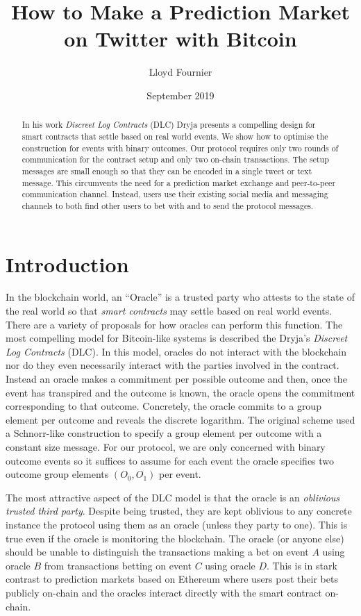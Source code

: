 \documentclass[runningheads]{llncs}
\begin{document}
\title{How to Make a Prediction Market on Twitter with Bitcoin}
\author{Lloyd Fournier}
\date{September 2019}

\maketitle

\begin{abstract}
In his work \emph{Discreet Log Contracts} (DLC) Dryja presents a compelling design for smart contracts that settle based on real world events. We show how to optimise the construction for events with binary outcomes. Our protocol requires only two rounds of communication for the contract setup and only two on-chain transactions. The setup messages are small enough so that they can be encoded in a single tweet or text message. This circumvents the need for a prediction market exchange and peer-to-peer communication channel. Instead, users use their existing social media and messaging channels to both find other users to bet with and to send the protocol messages.
\end{abstract}


\section{Introduction}

In the blockchain world, an ``Oracle'' is a trusted party who attests to the state of the real world so that \emph{smart contracts} may settle based on real world events. There are a variety of proposals for how oracles can perform this function. The most compelling model for Bitcoin-like systems is described the Dryja's \textit{Discreet Log Contracts} (DLC)\cite{DLC}. In this model, oracles do not interact with the blockchain nor do they even necessarily interact with the parties involved in the contract. Instead an oracle makes a commitment per possible outcome and then, once the event has transpired and the outcome is known, the oracle opens the commitment corresponding to that outcome. Concretely, the oracle commits to a group element per outcome and reveals the discrete logarithm. The original scheme used a Schnorr-like construction to specify a group element per outcome with a constant size message. For our protocol, we are only concerned with binary outcome events so it suffices to assume for each event the oracle specifies two outcome group elements $(O_0,O_1)$ per event.

The most attractive aspect of the DLC model is that the oracle is an \emph{oblivious trusted third party}\cite{cryptoeprint:2011:319}. Despite being trusted, they are kept oblivious to any concrete instance the protocol using them as an oracle (unless they party to one). This is true even if the oracle is monitoring the blockchain. The oracle (or anyone else) should be unable to distinguish the transactions making a bet on event $A$ using oracle $B$ from transactions betting on event $C$ using oracle $D$. This is in stark contrast to prediction markets based on Ethereum\cite{augur} where users post their bets publicly on-chain and the oracles interact directly with the smart contract on-chain.
\end{document}

